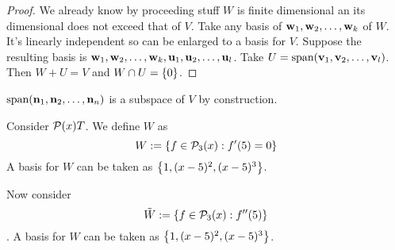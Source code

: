 \begin{proof}
    We already know by proceeding stuff $W$ is finite dimensional an its dimensional does not exceed that of $V$. Take any basis of ${\mathbf w}_1,{\mathbf w}_2, \ldots, {\mathbf w}_{k}$ of $W$. It's linearly independent so can be enlarged to a basis for $V$. Suppose the resulting basis is ${\mathbf w}_1,{\mathbf w}_2, \ldots, {\mathbf w}_{k}, {\mathbf u}_1,{\mathbf u}_2, \ldots, {\mathbf u}_{l}$. Take $U = \text{span} ({\mathbf v}_1,{\mathbf v}_2, \ldots, {\mathbf v}_{l})$. Then $W + U = V$ and $W \cap U = \left\{ 0 \right\}$. 
\end{proof}
\begin{remark}
    $\text{span} ({\mathbf n}_1,{\mathbf n}_2, \ldots, {\mathbf n}_{n})$ is a subspace of $V$ by construction.
\end{remark}
\begin{example}
    Consider $\mathcal P(x)T$. We define $W$ as
    \[ W:= \left\{ f \in \mathcal P_3(x) : f'(5) = 0 \right\}\]
    A basis for $W$ can be taken as $\left\{ 1, (x - 5)^2, (x-5)^3 \right\}$. 
    
    \noindent Now consider \[\tilde W:= \left\{ f \in \mathcal P_3(x) : f''(5) \right\}\].
    A basis for $W$ can be taken as $\left\{ 1, (x - 5)^2, (x-5)^3 \right\}$. \\
\end{example}
